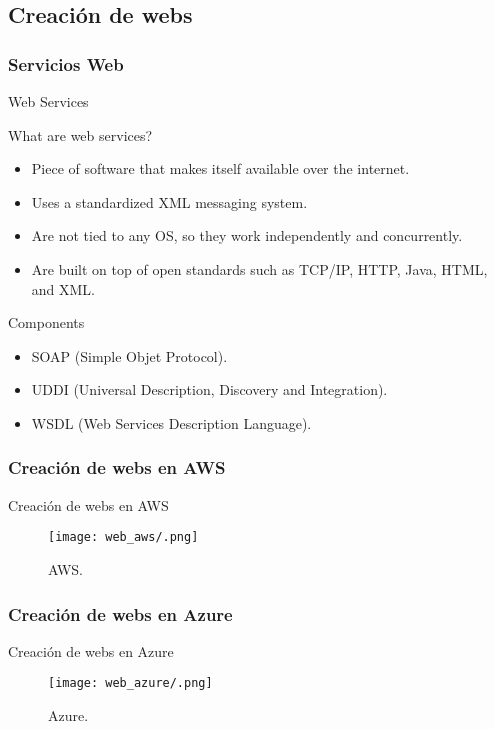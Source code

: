 \documentclass[aspectratio=169]{beamer}
\begin{document}
\subsection{Creación de webs}
\subsubsection{Servicios Web}
\begin{frame}{Web Services}
\begin{block}{What are web services?}
	\begin{itemize}
		\item Piece of software that makes itself available over the internet.
		\item Uses a standardized XML messaging system.
		\item Are not tied to any OS, so they work independently and concurrently.
		\item Are built on top of open standards such as TCP/IP, HTTP, Java, HTML, and XML.
	\end{itemize}
\end{block}
\begin{block}{Components}
	\begin{itemize}
		\item SOAP (Simple Objet Protocol).
		\item UDDI (Universal Description, Discovery and Integration).
		\item WSDL (Web Services Description Language).
	\end{itemize}
\end{block}
\end{frame}

\subsubsection{Creación de webs en AWS}
\begin{frame}{Creación de webs en AWS}
	\begin{figure}[h]
		\centering
		\texttt{[image: web\_aws/.png]}
		\caption{ AWS.}
		\label{}
	\end{figure}
\end{frame}

\subsubsection{Creación de webs en Azure}
\begin{frame}{Creación de webs en Azure}
	\begin{figure}[h]
		\centering
		\texttt{[image: web\_azure/.png]}
		\caption{ Azure.}
		\label{}
	\end{figure}
\end{frame}
\end{document}
